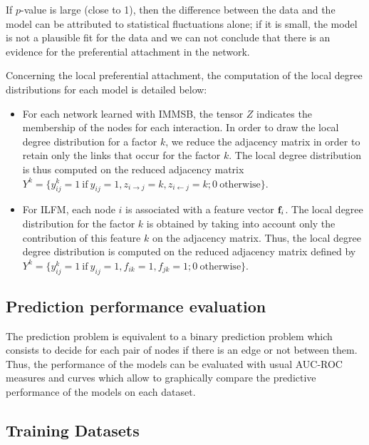 If  $p$-value is large (close to 1), then the difference between the data and the model can be attributed to statistical fluctuations alone; if it is small, the model is not a plausible fit for the data and we can not conclude that there is an evidence for the preferential attachment in the network. 


Concerning the local preferential attachment, 
the computation of the local degree distributions for each model is detailed below: 
\begin{itemize}
    \item For each network learned with IMMSB, the tensor $Z$ indicates the membership of the nodes for each  interaction. In order to draw the local degree distribution for a factor $k$, we reduce the adjacency matrix in order to retain only the links that occur for the factor $k$. The local degree distribution is thus computed on the reduced adjacency matrix  $Y^k =\{ y_{ij}^k=1 \ \textrm{if}\ y_{ij}=1 , z_{i\rightarrow j}=k, z_{i\leftarrow j}=k; 0 \ \textrm{otherwise} \}$.
        \item For ILFM, each node $i$ is associated with a feature vector $\mathbf{f}_{i}$. The local degree distribution for the factor $k$ is obtained by taking into account only the contribution of this feature $k$ on the adjacency matrix. Thus, the local degree degree distribution is computed on the reduced adjacency matrix defined by $Y^k =\{ y_{ij}^k=1 \ \textrm{if}\ y_{ij}=1 , f_{ik}=1, f_{jk}=1; 0 \ \textrm{otherwise}\}$.
\end{itemize}


\subsection{Prediction performance evaluation}
The prediction problem is equivalent to a binary prediction problem which consists to decide for each pair of nodes if there is an edge or not between them. 
Thus, the performance of the models can be evaluated with usual AUC-ROC measures and curves which allow to graphically compare the predictive performance of the models on each dataset.

\subsection{Training Datasets}

